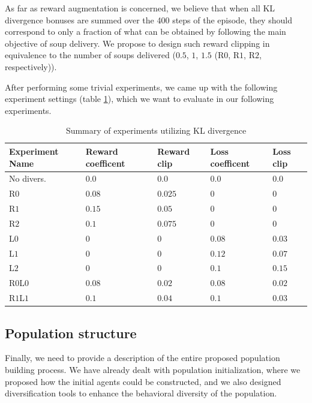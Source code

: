As far as reward augmentation is concerned, we believe that when all KL divergence bonuses are summed over the 400 steps of the episode, they should correspond to only a fraction of what can be obtained by following the main objective of soup delivery.
We propose to design such reward clipping in equivalence to the number of soups delivered ($0.5$, $1$, $1.5$ (R$0$, R$1$, R$2$, respectively)).

After performing some trivial experiments, we came up with the following experiment settings (table \ref{tab:KLDiv-coefiicents}), which we want to evaluate in our following experiments.



\begin{table}[htbp]
    \small
    \centering
    \begin{tabular}{lllll}
      \toprule
      Experiment Name        & Reward coefficent     & Reward clip  & Loss coefficent  & Loss clip          \\ \midrule

      No divers.     & $0.0$     & $0.0$   & $0.0$     & $0.0$                        \\\midrule  
      R$0$     & $0.08$     & $0.025$   & $0$     & $0$                        \\
      R$1$     & $0.15$     & $0.05$   & $0$     & $0$                        \\
      R$2$     & $0.1$     & $0.075$   & $0$     & $0$                        \\\midrule
      L$0$     & $0$     & $0$   & $0.08$     & $0.03$                        \\
      L$1$     & $0$     & $0$   & $0.12$     & $0.07$                        \\      
      L$2$     & $0$     & $0$   & $0.1$     & $0.15$                        \\\midrule      
      R$0$L$0$     & $0.08$     & $0.02$   & $0.08$     & $0.02$                        \\
      R$1$L$1$     & $0.1$     & $0.04$   & $0.1$     & $0.03$                        \\
      
     \bottomrule
    \end{tabular}
    \caption{Summary of experiments utilizing KL divergence}
    \label{tab:KLDiv-coefiicents}
\end{table}


\subsection{Population structure}
Finally, we need to provide a description of the entire proposed population building process.
We have already dealt with population initialization, where we proposed how the initial agents could be constructed, and we also designed diversification tools to enhance the behavioral diversity of the population.

